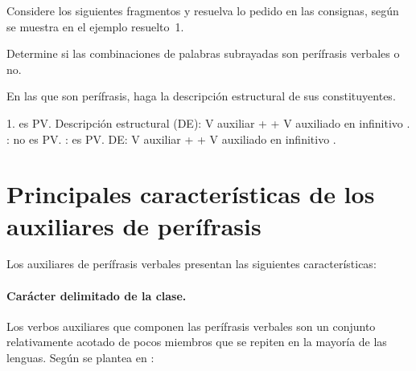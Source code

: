 \begin{ejercicio}\label{ej:11-tato}
Considere los siguientes fragmentos y resuelva lo pedido en las consignas, según
se muestra en el ejemplo resuelto~1.

\begin{consignas}
  \item Determine si las combinaciones de palabras subrayadas son perífrasis
        verbales o no.
  \item En las que son perífrasis, haga la descripción estructural de sus
        constituyentes.
\end{consignas}


\begin{resuelto}
1.  es PV. Descripción estructural (DE): V
auxiliar  +  + V auxiliado en infinitivo
. : no es PV. : es PV. DE: V auxiliar  +  + V auxiliado en
infinitivo .
\end{resuelto}
\end{ejercicio}

\section{Principales características de los auxiliares de perífrasis}\label{sec:11-auxiliares}

Los auxiliares de perífrasis verbales presentan las siguientes características:

\paragraph{Carácter delimitado de la clase.} Los verbos auxiliares que componen
las perífrasis verbales son un conjunto relativamente acotado de pocos miembros
que se repiten en la mayoría de las lenguas. Según se plantea en
\textcite[205]{giammatteo2018marcovecchio}:

